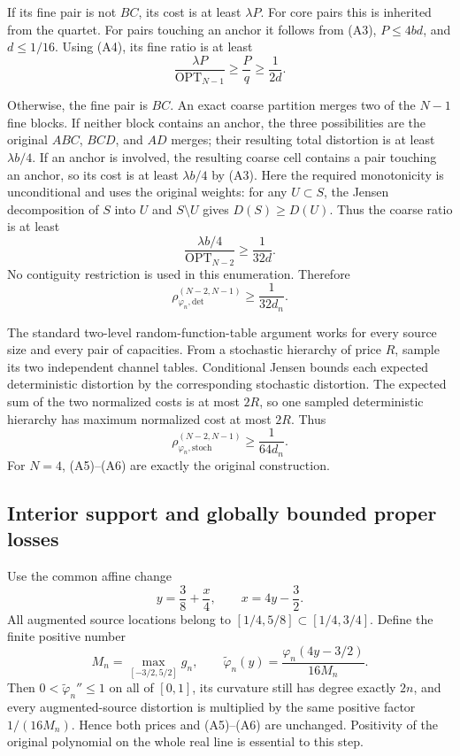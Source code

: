 If its fine pair is not $BC$, its cost is at least $\lambda P$.
For core pairs this is inherited from the quartet. For pairs touching
an anchor it follows from (A3), $P\le4bd$, and $d\le1/16$.
Using (A4), its fine ratio is at least
\[
 \frac{\lambda P}{\operatorname{OPT}_{N-1}}
 \ge\frac Pq\ge\frac1{2d}.
\]

Otherwise, the fine pair is $BC$. An exact coarse partition merges
two of the $N-1$ fine blocks. If neither block contains an anchor, the
three possibilities are the original $ABC$, $BCD$, and $AD$ merges;
their resulting total distortion is at least $\lambda b/4$.
If an anchor is involved, the resulting coarse cell contains a pair
touching an anchor, so its cost is at least $\lambda b/4$ by (A3).
Here the required monotonicity is unconditional and uses the original
weights: for any $U\subset S$, the Jensen decomposition of $S$ into
$U$ and $S\setminus U$ gives $D(S)\ge D(U)$.
Thus the coarse ratio is at least
\[
 \frac{\lambda b/4}{\operatorname{OPT}_{N-2}}
 \ge\frac1{32d}.
\]
No contiguity restriction is used in this enumeration. Therefore
\begin{equation}
 \rho_{\varphi_n,\mathrm{det}}^{(N-2,N-1)}\ge\frac1{32d_n}.
 \tag{A5}
\end{equation}

The standard two-level random-function-table argument works for every
source size and every pair of capacities. From a stochastic hierarchy
of price $R$, sample its two independent channel tables. Conditional
Jensen bounds each expected deterministic distortion by the corresponding
stochastic distortion. The expected sum of the two normalized costs is
at most $2R$, so one sampled deterministic hierarchy has maximum
normalized cost at most $2R$. Thus
\begin{equation}
 \rho_{\varphi_n,\mathrm{stoch}}^{(N-2,N-1)}\ge\frac1{64d_n}.
 \tag{A6}
\end{equation}
For $N=4$, (A5)--(A6) are exactly the original construction.

\subsection{Interior support and globally bounded proper losses}
Use the common affine change
\[
 y=\frac38+\frac x4,
 \qquad x=4y-\frac32.
\]
All augmented source locations belong to $[1/4,5/8]\subset[1/4,3/4]$.
Define the finite positive number
\[
 M_n=\max_{[-3/2,5/2]}g_n,
 \qquad
 \widetilde\varphi_n(y)=
 \frac{\varphi_n(4y-3/2)}{16M_n}.
\]
Then $0<\widetilde\varphi_n''\le1$ on all of $[0,1]$, its curvature
still has degree exactly $2n$, and every augmented-source distortion is
multiplied by the same positive factor $1/(16M_n)$. Hence both prices
and (A5)--(A6) are unchanged. Positivity of the original polynomial on
the whole real line is essential to this step.

